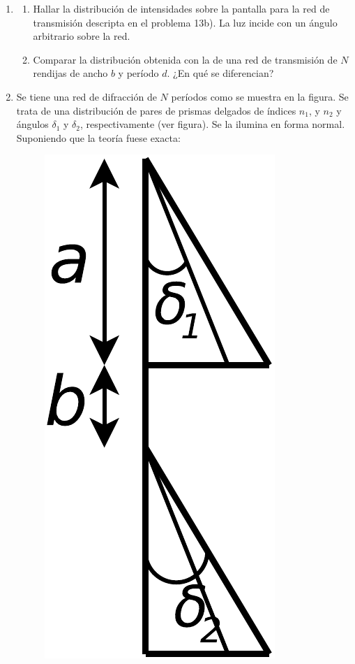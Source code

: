 \documentclass[11pt,spanish,a4paper]{article}
\begin{document}
\begin{enumerate}
\item 
\begin{enumerate}
\item Hallar la distribución de intensidades sobre la pantalla para la red
de transmisión descripta en el problema 13b). La luz incide con un
ángulo arbitrario sobre la red.
\item Comparar la distribución obtenida con la de una red de transmisión
de $N$ rendijas de ancho $b$ y período $d$. ¿En qué se diferencian? 
\end{enumerate}


\item Se tiene una red de difracción de $N$ períodos como se muestra en
la figura. Se trata de una distribución de pares de prismas delgados
de índices $n_{1}$, y $n_{2}$ y ángulos $\delta_{1}$ y $\delta_{2}$,
respectivamente (ver figura). Se la ilumina en forma normal. Suponiendo
que la teoría fuese exacta:
\begin{figure}[H]
\centering{}\includegraphics[clip,scale=0.3]{ej5-46}

\end{figure}
\end{enumerate}
\end{document}
